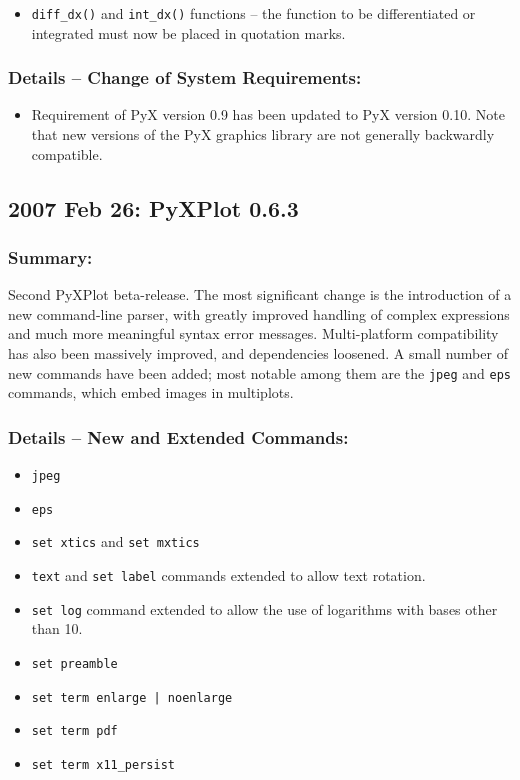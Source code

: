 \begin{itemize}
\item {\tt diff\_dx()} and {\tt int\_dx()} functions -- the function to be
differentiated or integrated must now be placed in quotation marks.
\end{itemize}

\subsubsection*{Details -- Change of System Requirements:}

\begin{itemize}
\item Requirement of PyX version 0.9 has been updated to PyX version 0.10. Note that new versions of the PyX graphics library are not generally backwardly compatible.
\end{itemize}

\subsection*{2007 Feb 26: PyXPlot 0.6.3}

\subsubsection*{Summary:}

Second PyXPlot beta-release. The most significant change is the introduction of
a new command-line parser, with greatly improved handling of complex
expressions and much more meaningful syntax error messages. Multi-platform
compatibility has also been massively improved, and dependencies loosened.  A
small number of new commands have been added; most notable among them are the
{\tt jpeg} and {\tt eps} commands, which embed images in multiplots.

\subsubsection*{Details -- New and Extended Commands:}

\begin{itemize}
\item {\tt jpeg}
\item {\tt eps}
\item {\tt set xtics} and {\tt set mxtics}
\item {\tt text} and {\tt set label} commands extended to allow text rotation.
\item {\tt set log} command extended to allow the use of logarithms with bases other than 10.
\item {\tt set preamble}
\item {\tt set term enlarge | noenlarge}
\item {\tt set term pdf}
\item {\tt set term x11\_persist}
\end{itemize}

